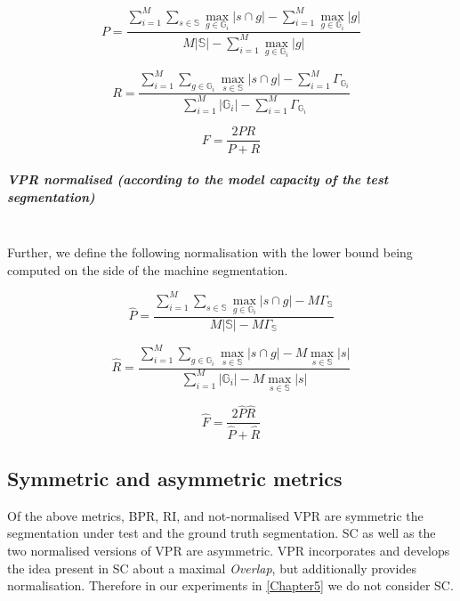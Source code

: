 \begin{equation}
P=\frac{\sum\limits _{i=1}^{M}\sum\limits _{s\in\mathbb{S}}\max\limits _{g\in\mathbb{G}_{i}}\left|s\cap g\right|-\boxed{\sum\limits _{i=1}^{M}\max\limits _{g\in\mathbb{G}_{i}}\left|g\right|}}{M\left|\mathbb{S}\right|-\boxed{\sum\limits _{i=1}^{M}\max\limits _{g\in\mathbb{G}_{i}}\left|g\right|}}
\end{equation}

\begin{equation}
R=\frac{\sum\limits _{i=1}^{M}\sum\limits _{g\in\mathbb{G}_{i}}\max\limits _{s\in\mathbb{S}}\left|s\cap g\right|-\boxed{\sum\limits _{i=1}^{M}\Gamma_{\mathbb{G}_{i}}}}{\sum\limits _{i=1}^{M}\left|\mathbb{G}_{i}\right|-\boxed{\sum\limits _{i=1}^{M}\Gamma_{\mathbb{G}_{i}}}}
\end{equation}

\begin{equation}
F=\frac{2PR}{P+R}
\end{equation}

\subparagraph{VPR normalised (according to the model capacity of the test segmentation)}\mbox{}\\ %
Further, we define the following normalisation with the lower bound being computed on the side of the machine segmentation.

\begin{equation}
\hat{P}=\frac{\sum\limits _{i=1}^{M}\sum\limits _{s\in\mathbb{S}}\max\limits _{g\in\mathbb{G}_{i}}\left|s\cap g\right|-\boxed{M\Gamma_{\mathbb{S}}}}{M\left|\mathbb{S}\right|-\boxed{M\Gamma_{\mathbb{S}}}}
\end{equation}

\begin{equation}
\hat{{R}}=\frac{\sum\limits _{i=1}^{M}\sum\limits _{g\in\mathbb{G}_{i}}\max\limits _{s\in\mathbb{S}}\left|s\cap g\right|-\boxed{M\max_{s\in\mathbb{S}}\left|s\right|}}{\sum\limits _{i=1}^{M}\left|\mathbb{G}_{i}\right|-\boxed{M\max_{s\in\mathbb{S}}\left|s\right|}}
\end{equation}

\begin{equation}
\hat{{F}}=\frac{2\hat{P}\hat{R}}{\hat{P}+\hat{R}}
\end{equation}

\subsection{Symmetric and asymmetric metrics}
Of the above metrics, BPR, RI, and not-normalised VPR are symmetric \wrt the segmentation under test and the ground truth segmentation. SC as well as the two normalised versions of VPR are asymmetric. VPR incorporates and develops the idea present in SC about a maximal \textit{Overlap}, but additionally provides normalisation. Therefore in our experiments in \cref{Chapter5} we do not consider SC.

